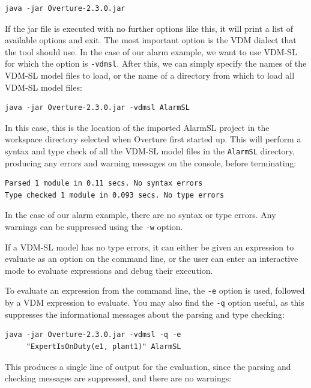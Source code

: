 \lstset{style=tool,language=}
\begin{lstlisting}
java -jar Overture-2.3.0.jar
\end{lstlisting}

\noindent If the jar file is executed with no further options like this, it will print a list of available options and exit. The most important option is the VDM dialect that the tool should use. In the
case of our alarm example, we want to use VDM-SL for which the option is \verb|-vdmsl|. After this, we can simply specify the names of the VDM-SL model files to load, or the name of a directory from which to
load all VDM-SL model files:

\begin{lstlisting}
java -jar Overture-2.3.0.jar -vdmsl AlarmSL
\end{lstlisting}

\noindent In this case, this is the location of the imported AlarmSL project in the workspace directory selected when Overture first started up.  This will perform a syntax and type check of all the VDM-SL model files in the \texttt{AlarmSL} directory, producing any errors and warning messages on the console, before terminating:

\begin{lstlisting}[style=mystyle]
Parsed 1 module in 0.11 secs. No syntax errors
Type checked 1 module in 0.093 secs. No type errors
\end{lstlisting}

\noindent In the case of our alarm example, there are no syntax or type errors. Any warnings can be suppressed using the \verb|-w| option.

If a VDM-SL model has no type errors, it can either be given an expression to evaluate as an option on the command line, or the user can enter an interactive mode to evaluate expressions and debug their execution.

To evaluate an expression from the command line, the \verb|-e| option is used, followed by a VDM expression to evaluate. You may also find the \verb|-q| option useful, as this suppresses the informational messages about the parsing and type checking:

\begin{lstlisting}[style=tool]
java -jar Overture-2.3.0.jar -vdmsl -q -e 
     "ExpertIsOnDuty(e1, plant1)" AlarmSL
\end{lstlisting}

\noindent This produces a single line of output for the evaluation, since the parsing and checking messages are suppressed, and there are no warnings:

